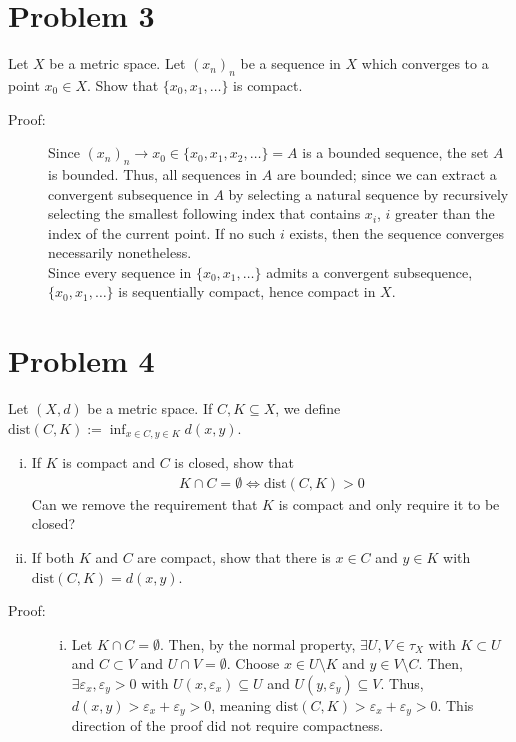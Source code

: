 \documentclass[10pt]{extarticle}
\begin{document}
  \section{Problem 3}%
  Let $X$ be a metric space. Let $(x_n)_n$ be a sequence in $X$ which converges to a point $x_0\in X$. Show that $\{x_0,x_1,\dots\}$ is compact.
  \begin{description}
    \item[Proof:] Since $(x_n)_n\rightarrow x_0\in \{x_0,x_1,x_2,\dots\} = A$ is a bounded sequence, the set $A$ is bounded. Thus, all sequences in $A$ are bounded; since we can extract a convergent subsequence in $A$ by selecting a natural sequence by recursively selecting the smallest following index that contains $x_{i}$, $i$ greater than the index of the current point. If no such $i$ exists, then the sequence converges necessarily nonetheless.\\

      Since every sequence in $\{x_0,x_1,\dots\}$ admits a convergent subsequence, $\{x_0,x_1,\dots\}$ is sequentially compact, hence compact in $X$.
  \end{description}
  \section{Problem 4}%
  Let $(X,d)$ be a metric space. If $C,K\subseteq X$, we define $\text{dist}(C,K):= \inf_{x\in C,y\in K}d(x,y)$.
  \begin{enumerate}[(i)]
    \item If $K$ is compact and $C$ is closed, show that 
      \begin{align*}
        K\cap C = \emptyset \Leftrightarrow \text{dist}(C,K)> 0
      \end{align*}
      Can we remove the requirement that $K$ is compact and only require it to be closed?
    \item If both $K$ and $C$ are compact, show that there is $x\in C$ and $y\in K$ with $\text{dist}(C,K) = d(x,y)$.
  \end{enumerate}
  \begin{description}
    \item[Proof:]\hfill
      \begin{enumerate}[(i)]
        \item Let $K\cap C = \emptyset$. Then, by the normal property, $\exists U,V\in \tau_X$ with $K\subset U$ and $C\subset V$ and $U\cap V = \emptyset$. Choose $x\in U\setminus K$ and $y\in V\setminus C$. Then, $\exists \varepsilon_x,\varepsilon_y>0$ with $U(x,\varepsilon_x)\subseteq U$ and $U(y,\varepsilon_y)\subseteq V$. Thus, $d(x,y) > \varepsilon_x + \varepsilon_y > 0$, meaning $\text{dist}(C,K) > \varepsilon_x + \varepsilon_y > 0$. This direction of the proof did not require compactness.
      \end{enumerate}
  \end{description}
\end{document}
